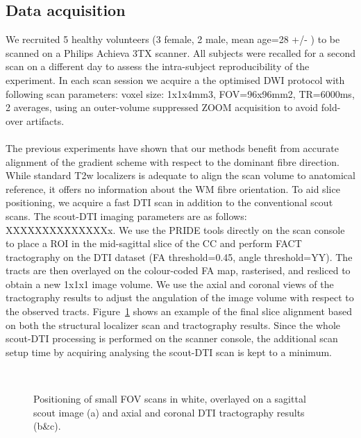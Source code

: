 \subsection*{Data acquisition}
We recruited 5 healthy volunteers (3 female, 2 male, mean age=28 +/- ) to be scanned on a Philips Achieva 3TX scanner. All subjects were recalled for a second scan on a different day to assess the intra-subject reproducibility of the experiment. In each scan session we acquire a the optimised \SF{} DWI protocol with following scan parameters: voxel size: 1x1x4mm3, FOV=96x96mm2, TR=6000ms, 2 averages, using an outer-volume suppressed ZOOM acquisition \citep{Wilm:2008} to avoid fold-over artifacts.  
\paragraph{}
The previous experiments have shown that our \SF{} methods benefit from accurate alignment of the gradient scheme with respect to the dominant fibre direction. While standard T2w localizers is adequate to align the scan volume to anatomical reference, it offers no information about the WM fibre orientation. To aid slice positioning, we acquire a fast DTI scan in addition to the conventional scout scans. The scout-DTI imaging parameters are as follows: XXXXXXXXXXXXXXx. We use the PRIDE tools directly on the scan console to place a ROI in the mid-sagittal slice of the CC and perform FACT tractography on the DTI dataset (FA threshold=0.45, angle threshold=YY). The tracts are then overlayed on the colour-coded FA map, rasterised, and resliced to obtain a new 1x1x1 image volume. We use the axial and coronal views of the tractography results to adjust the angulation of the \SF{} image volume with respect to the observed tracts.  Figure~\ref{fig:chap9 FOV positioning} shows an example of the final slice alignment based on both the structural localizer scan and tractography results. Since the whole scout-DTI processing is performed on the scanner console, the additional scan setup time by acquiring analysing the scout-DTI scan is kept to a minimum.

\begin{figure}[ht]
	\centering
	\begin{minipage}{0.35\textwidth}
	\\
	\end{minipage}\hspace{0.05\textwidth}
	\begin{minipage}{0.53\textwidth}
	\end{minipage}
	
	\caption{Positioning of small FOV scans in white, overlayed on a sagittal scout image (a) and axial and coronal DTI tractography results (b\&c).}
	\label{fig:chap9 FOV positioning}	
\end{figure}
